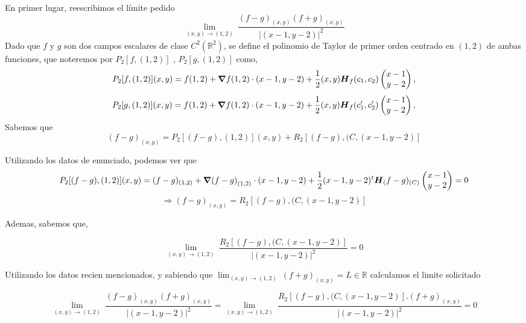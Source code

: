 \begin{solution}
   En primer lugar, reescribimos el límite pedido 
   \[
        \lim_{(x,y)\to(1,2)} \
        \frac{(f-g)_{(x,y)}(f+g)_{(x,y) }}{|(x-1,y-2)|^2}
    \]
    Dado que $f$  y $g$ son dos campos escalares de clase  $C^2(\mathbb{R}^2)$,  se define  el polinomio de Taylor de primer orden centrado en $(1,2)$ de ambas funciones, que noteremos por $P_2[f,(1,2)]$ , $P_2[g,(1,2)]$ como,
    \begin{equation}
        P_2[f,(1,2)](x,y)=f(1,2)+\grad f(1,2)\cdot(x-1,y-2)+ \frac{1}{2}(x,y)\boldsymbol{H}_f(c_1,c_2)\begin{pmatrix}x-1\\y-2\end{pmatrix}, \label{eq:polTay2}
    \end{equation}
    \begin{equation}
        P_2[g,(1,2)](x,y)=f(1,2)+\grad f(1,2)\cdot(x-1,y-2)+ \frac{1}{2}(x,y)\boldsymbol{H}_f(c_1',c_2')\begin{pmatrix}x-1\\y-2\end{pmatrix}, \label{eq:polTay2}
    \end{equation}
Sabemos que
\[
        (f-g)_{(x,y)}=  P_2[(f-g),(1,2)](x,y) + R_2[(f-g),(C,(x-1,y-2)] 
    \]
  

Utilizando los datos de enunciado, podemos ver que
\[
       P_2[(f-g),(1,2)](x,y)= (f-g)_{(1,2)}+\grad (f-g)_{(1,2)}\cdot(x-1,y-2)+ \frac{1}{2}(x-1, y-2)^t\boldsymbol{H}_(f-g)_{(C)}\begin{pmatrix}x-1\\y-2\end{pmatrix} =0
    \]
    \[
      \Rightarrow 
        (f-g)_{(x,y)}=  R_2[(f-g),(C,(x-1,y-2)] 
    \]

    Ademas, sabemos que,
  
    \[
        \lim_{(x,y)\to(1,2)} \
        \frac{R_2[(f-g),(C,(x-1,y-2)]}{|(x-1,y-2)|^2}=0
    \]

Utilizando los datos recien mencionados, y sabiendo que $ \lim_{(x,y)\to(1,2)} \
        (f+g)_{(x,y) }=L \in \mathbb{R} $ calculamos el limite solicitado

  \[
        \lim_{(x,y)\to(1,2)} \
        \frac{(f-g)_{(x,y)}(f+g)_{(x,y) }}{|(x-1,y-2)|^2}=\lim_{(x,y)\to(1,2)} \
        \frac{R_2[(f-g),(C,(x-1,y-2)]. (f+g)_{(x,y) }}{|(x-1,y-2)|^2}=0
    \]
    
    
 
\end{solution}

